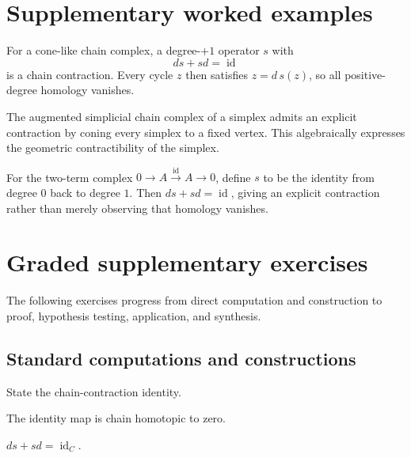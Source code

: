 \section{Supplementary worked examples}
\label{sec:viii23-pedagogy}

\begin{example}\label{ex:viii23-ped-01}
For a cone-like chain complex, a degree-$+1$ operator $s$ with
\[
ds+sd=\operatorname{id}
\]
is a chain contraction. Every cycle $z$ then satisfies $z=d\,s(z)$, so all positive-degree homology vanishes.
\end{example}

\begin{example}\label{ex:viii23-ped-02}
The augmented simplicial chain complex of a simplex admits an explicit contraction by coning every simplex to a fixed vertex. This algebraically expresses the geometric contractibility of the simplex.
\end{example}

\begin{example}\label{ex:viii23-ped-03}
For the two-term complex $0\to A\xrightarrow{\operatorname{id}}A\to0$, define $s$ to be the identity from degree $0$ back to degree $1$. Then $ds+sd=\operatorname{id}$, giving an explicit contraction rather than merely observing that homology vanishes.
\end{example}

\section{Graded supplementary exercises}
The following exercises progress from direct computation and construction to proof, hypothesis testing, application, and synthesis.

\subsection*{Standard computations and constructions}

\begin{exercise}\label{exr:viii23-ped-01}
State the chain-contraction identity.
\end{exercise}
\begin{hint}
The identity map is chain homotopic to zero.
\end{hint}
\begin{solution}
$ds+sd=\operatorname{id}_C$.
\end{solution}

